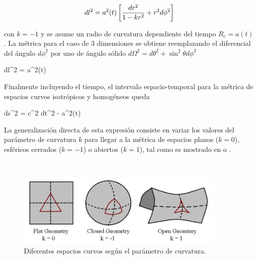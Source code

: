 \[ dl^2 = a^2(t) \left[  \frac{dr^2}{1-kr^2} + r^2 d\phi^2  \right] \]


con $k = -1$ y se asume un radio de curvatura dependiente del tiempo 
$R_c = a(t)$.
La métrica para el caso de 3 dimensiones se obtiene reemplazando el 
diferencial del ángulo $d\phi^2$ por uno de ángulo sólido $d\Omega^2 = 
d\theta^2 + \sin^2\theta d\phi^2$

 
{ dl^2 = a^2(t)  }


Finalmente incluyendo el tiempo, el intervalo espacio-temporal para la 
métrica de espacios curvos isotrópicos y homogéneos queda


{ ds^2 = c^2 dt^2 - a^2(t)  }


La generalización directa de esta expresión consiste en variar los valores
del parámetro de curvatura $k$ para llegar a la métrica de espacios planos 
($k = 0$), esféricos cerrados ($k = -1$) o abiertos ($k = 1$), tal como
es mostrado en \cite{longair2008} o \cite{padmanabhan1995}.

\
\begin{figure}[htbp]
	\centering
	\includegraphics[width=0.9\textwidth]
	{./figures/2_theoretical_framework/Curved_Spaces.png}

	\caption{\small{Diferentes espacios curvos según el parámetro de curvatura.}}
	
	\label{fig:CurvedSpaces}
\end{figure}
\

